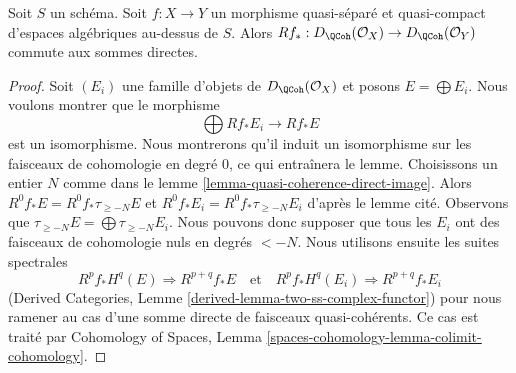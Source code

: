 \begin{lemma}
\label{lemma-quasi-coherence-pushforward-direct-sums}
Soit $S$ un schéma. Soit $f : X \to Y$ un morphisme quasi-séparé et
quasi-compact d'espaces algébriques au-dessus de $S$. Alors
$Rf_* : D_\QCoh(\mathcal{O}_X) \to D_\QCoh(\mathcal{O}_Y)$
commute aux sommes directes.
\end{lemma}

\begin{proof}
Soit $(E_i)$ une famille d'objets de $D_\QCoh(\mathcal{O}_X)$
et posons $E = \bigoplus E_i$. Nous voulons montrer que le morphisme
$$
\bigoplus Rf_*E_i \longrightarrow Rf_*E
$$
est un isomorphisme. Nous montrerons qu'il induit un isomorphisme sur les
faisceaux de cohomologie en degré $0$, ce qui entraînera le lemme.
Choisissons un entier $N$ comme dans le lemme \ref{lemma-quasi-coherence-direct-image}.
Alors $R^0f_*E = R^0f_*\tau_{\geq -N}E$ et
$R^0f_*E_i = R^0f_*\tau_{\geq -N}E_i$ d'après le lemme cité. Observons que
$\tau_{\geq -N}E = \bigoplus \tau_{\geq -N}E_i$.
Nous pouvons donc supposer que tous les $E_i$ ont des faisceaux de cohomologie
nuls en degrés $< -N$. Nous utilisons ensuite les suites spectrales
$$
R^pf_*H^q(E) \Rightarrow R^{p + q}f_*E
\quad\text{et}\quad
R^pf_*H^q(E_i) \Rightarrow R^{p + q}f_*E_i
$$
(Derived Categories, Lemme \ref{derived-lemma-two-ss-complex-functor})
pour nous ramener au cas d'une somme directe de faisceaux quasi-cohérents.
Ce cas est traité par
Cohomology of Spaces, Lemma \ref{spaces-cohomology-lemma-colimit-cohomology}.
\end{proof}

